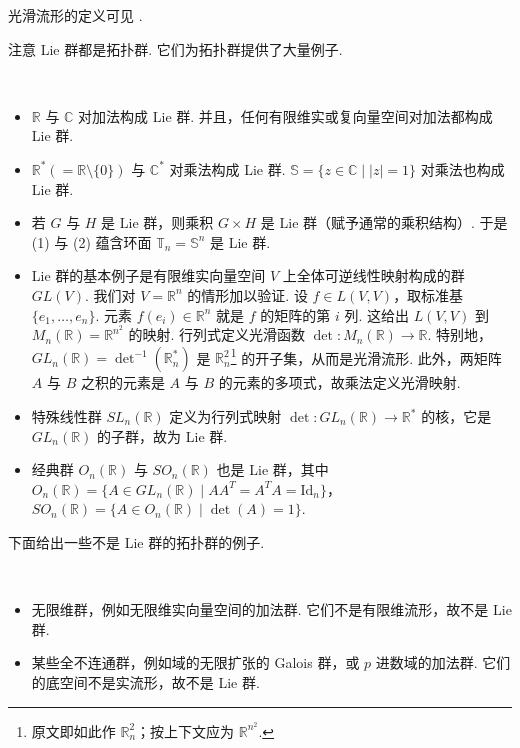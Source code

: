 光滑流形的定义可见 \cite[Chapter 2]{lang02b}.

\begin{remark}\label{c1-rem-6-2}
注意 Lie 群都是拓扑群. 它们为拓扑群提供了大量例子.
\end{remark}

\begin{examples}\label{c1-ex-6-3}
\
\begin{itemize}
    \item $\mathbb{R}$ 与 $\mathbb{C}$ 对加法构成 Lie 群. 并且，任何有限维实或复向量空间对加法都构成 Lie 群.
    \item $\mathbb{R}^{*}(=\mathbb{R}\setminus\{0\})$ 与 $\mathbb{C}^{*}$ 对乘法构成 Lie 群. $\mathbb{S}=\{z\in\mathbb{C}\mid |z|=1\}$ 对乘法也构成 Lie 群.
    \item 若 $G$ 与 $H$ 是 Lie 群，则乘积 $G\times H$ 是 Lie 群（赋予通常的乘积结构）. 于是 (1) 与 (2) 蕴含环面 $\mathbb{T}_{n}=\mathbb{S}^{n}$ 是 Lie 群.
    \item Lie 群的基本例子是有限维实向量空间 $V$ 上全体可逆线性映射构成的群 $GL(V)$. 我们对 $V=\mathbb{R}^{n}$ 的情形加以验证. 设 $f\in L(V,V)$，取标准基 $\{e_{1},\ldots,e_{n}\}$. 元素 $f(e_{i})\in\mathbb{R}^{n}$ 就是 $f$ 的矩阵的第 $i$ 列. 这给出 $L(V,V)$ 到 $M_{n}(\mathbb{R})=\mathbb{R}^{n^{2}}$ 的映射. 行列式定义光滑函数 $\det:M_{n}(\mathbb{R})\to\mathbb{R}$. 特别地，$GL_{n}(\mathbb{R})=\det^{-1}(\mathbb{R}_{n}^{*})$ 是 $\mathbb{R}^{2}_{n}$\footnote{原文即如此作 $\mathbb{R}^{2}_{n}$；按上下文应为 $\mathbb{R}^{n^{2}}$.} 的开子集，从而是光滑流形. 此外，两矩阵 $A$ 与 $B$ 之积的元素是 $A$ 与 $B$ 的元素的多项式，故乘法定义光滑映射.
    \item 特殊线性群 $SL_{n}(\mathbb{R})$ 定义为行列式映射 $\det:GL_{n}(\mathbb{R})\to\mathbb{R}^{*}$ 的核，它是 $GL_{n}(\mathbb{R})$ 的子群，故为 Lie 群.
    \item 经典群 $O_{n}(\mathbb{R})$ 与 $SO_{n}(\mathbb{R})$ 也是 Lie 群，其中 $O_{n}(\mathbb{R})=\{A\in GL_{n}(\mathbb{R})\mid AA^{T}=A^{T}A=\mathrm{Id}_{n}\}$，$SO_{n}(\mathbb{R})=\{A\in O_{n}(\mathbb{R})\mid \det(A)=1\}$.
\end{itemize}
\end{examples}

下面给出一些不是 Lie 群的拓扑群的例子.

\begin{examples}\label{c1-ex-6-4}
\
\begin{itemize}
    \item 无限维群，例如无限维实向量空间的加法群. 它们不是有限维流形，故不是 Lie 群.
    \item 某些全不连通群，例如域的无限扩张的 Galois 群，或 $p$ 进数域的加法群. 它们的底空间不是实流形，故不是 Lie 群.
\end{itemize}
\end{examples}
